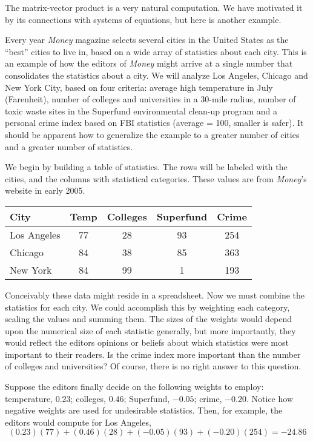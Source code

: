 \documentclass{ximera}
\begin{document}
The matrix-vector product is a very natural computation.  We have
motivated it by its connections with systems of equations, but here is
another example.

\begin{example}

  Every year \textit{Money} magazine selects several cities in the
  United States as the ``best'' cities to live in, based on a wide
  array of statistics about each city.  This is an example of how the
  editors of \textit{Money} might arrive at a single number that
  consolidates the statistics about a city.  We will analyze Los
  Angeles, Chicago and New York City, based on four criteria: average
  high temperature in July (Farenheit), number of colleges and
  universities in a 30-mile radius, number of toxic waste sites in the
  Superfund environmental clean-up program and a personal crime index
  based on FBI statistics (average = 100, smaller is safer).  It
  should be apparent how to generalize the example to a greater number
  of cities and a greater number of statistics.

  We begin by building a table of statistics.  The rows will be
  labeled with the cities, and the columns with statistical
  categories.  These values are from \textit{Money}'s website in early
  2005.

  \begin{tabular}{||l||c|c|c|c||}\hline
    City & Temp & Colleges & Superfund & Crime\\\hline\hline
    Los Angeles & 77 & 28 & 93 & 254\\\hline
    Chicago & 84 & 38 & 85 & 363\\\hline
    New York & 84 & 99 & 1 & 193\\\hline\hline
  \end{tabular}

  Conceivably these data might reside in a spreadsheet.  Now we must
  combine the statistics for each city.  We could accomplish this by
  weighting each category, scaling the values and summing them.  The
  sizes of the weights would depend upon the numerical size of each
  statistic generally, but more importantly, they would reflect the
  editors opinions or beliefs about which statistics were most
  important to their readers.  Is the crime index more important than
  the number of colleges and universities?  Of course, there is no
  right answer to this question.

  Suppose the editors finally decide on the following weights to
  employ: temperature, $0.23$; colleges, $0.46$; Superfund, $-0.05$;
  crime, $-0.20$.  Notice how negative weights are used for
  undesirable statistics.  Then, for example, the editors would
  compute for Los Angeles,
  \[
    (0.23)(77) + (0.46)(28) + (-0.05)(93) + (-0.20)(254) = -24.86
  \]


\end{example}
\end{document}
